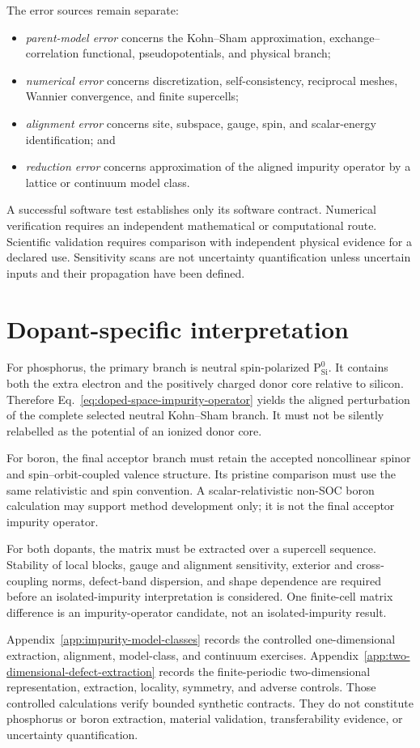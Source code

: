 The error sources remain separate:
\begin{itemize}
    \item \emph{parent-model error} concerns the Kohn--Sham approximation,
    exchange--correlation functional, pseudopotentials, and physical branch;
    \item \emph{numerical error} concerns discretization, self-consistency,
    reciprocal meshes, Wannier convergence, and finite supercells;
    \item \emph{alignment error} concerns site, subspace, gauge, spin, and
    scalar-energy identification; and
    \item \emph{reduction error} concerns approximation of the aligned
    impurity operator by a lattice or continuum model class.
\end{itemize}
A successful software test establishes only its software contract. Numerical
verification requires an independent mathematical or computational route.
Scientific validation requires comparison with independent physical evidence
for a declared use. Sensitivity scans are not uncertainty quantification unless
uncertain inputs and their propagation have been defined.

\section{Dopant-specific interpretation}

For phosphorus, the primary branch is neutral spin-polarized
$\mathrm P_{\mathrm{Si}}^{0}$. It contains both the extra electron and the
positively charged donor core relative to silicon. Therefore
Eq.~\eqref{eq:doped-space-impurity-operator} yields the aligned perturbation of
the complete selected neutral Kohn--Sham branch. It must not be silently
relabelled as the potential of an ionized donor core.

For boron, the final acceptor branch must retain the accepted noncollinear
spinor and spin--orbit-coupled valence structure. Its pristine comparison must
use the same relativistic and spin convention. A scalar-relativistic non-SOC
boron calculation may support method development only; it is not the final
acceptor impurity operator.

For both dopants, the matrix must be extracted over a supercell sequence.
Stability of local blocks, gauge and alignment sensitivity, exterior and
cross-coupling norms, defect-band dispersion, and shape dependence are required
before an isolated-impurity interpretation is considered. One finite-cell
matrix difference is an impurity-operator candidate, not an isolated-impurity
result.

Appendix~\ref{app:impurity-model-classes} records the controlled
one-dimensional extraction, alignment, model-class, and continuum exercises.
Appendix~\ref{app:two-dimensional-defect-extraction} records the finite-periodic
two-dimensional representation, extraction, locality, symmetry, and adverse
controls. Those controlled calculations verify bounded synthetic contracts.
They do not constitute phosphorus or boron extraction, material validation,
transferability evidence, or uncertainty quantification.
